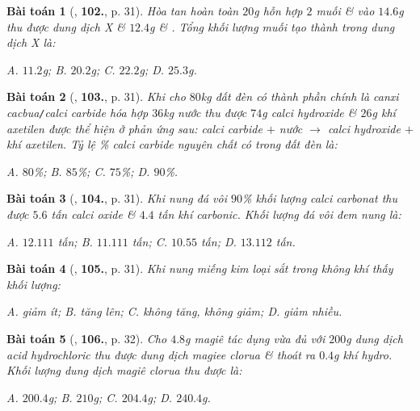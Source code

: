 \documentclass{article}
\numberwithin{equation}{section}
\newtheorem{baitoan}{Bài toán}
\begin{document}
\begin{baitoan}[\cite{An2011}, \textbf{102.}, p. 31]
	Hòa tan hoàn toàn $20$g hỗn hợp $2$ muối  \&  vào $14.6$g  thu được dung dịch X \& $12.4$g  \& . Tổng khối lượng muối tạo thành trong dung dịch X là:
	
		{\sf A.} $11.2$g;
		{\sf B.} $20.2$g;
		{\sf C.} $22.2$g;
		{\sf D.} $25.3$g.
	
\end{baitoan}

\begin{baitoan}[\cite{An2011}, \textbf{103.}, p. 31]
	Khi cho $80$kg đất đèn có thành phần chính là canxi cacbua\emph{\texttt{/}}calci carbide hóa hợp $36$kg nước thu được $74$g calci hydroxide \& $26$g khí axetilen được  thể hiện ở phản ứng sau: calci carbide $+$ nước $\to$ calci hydroxide $+$ khí axetilen. Tỷ lệ \% calci carbide nguyên chất có trong đất đèn là:
	
		{\sf A.} $80$\%;
		{\sf B.} $85$\%;
		{\sf C.} $75$\%;
		{\sf D.} $90$\%.
	
\end{baitoan}

\begin{baitoan}[\cite{An2011}, \textbf{104.}, p. 31]
	Khi nung đá vôi $90$\% khối lượng calci carbonat  thu được $5.6$ tấn calci oxide  \& $4.4$ tấn khí carbonic. Khối lượng đá vôi đem nung là:
	
		{\sf A.} $12.111$ tấn;
		{\sf B.} $11.111$ tấn;
		{\sf C.} $10.55$ tấn;
		{\sf D.} $13.112$ tấn.
	
\end{baitoan}

\begin{baitoan}[\cite{An2011}, \textbf{105.}, p. 31]
	Khi nung miếng kim loại sắt trong không khí thấy khối lượng:
	
		{\sf A.} giảm ít;
		{\sf B.} tăng lên;
		{\sf C.} không tăng, không giảm;
		{\sf D.} giảm nhiều.
	
\end{baitoan}

\begin{baitoan}[\cite{An2011}, \textbf{106.}, p. 32]
	Cho $4.8$g magiê tác dụng vừa đủ với $200$g dung dịch acid hydrochloric thu được dung dịch magiee clorua \& thoát ra $0.4$g khí hydro. Khối lượng dung dịch magiê clorua thu được là:
	
		{\sf A.} $200.4$g;
		{\sf B.} $210$g;
		{\sf C.} $204.4$g;
		{\sf D.} $240.4$g.
	
\end{baitoan}
\end{document}
